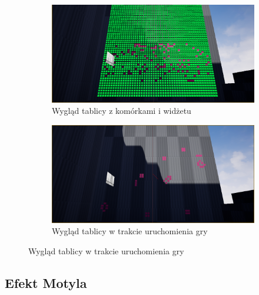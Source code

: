 \documentclass[a4paper,12pt,reqno]{article}
\begin{document}
\begin{figure}[!ht]%
	\centering
	\begin{subfigure}{.5\textwidth}
		\centering
		\includegraphics[width=0.9\linewidth]{graphics/gameoflife/GOLInUE_1.png}
		\caption{Wygląd tablicy z komórkami i widżetu}	
		\label{ref:subref_a}
	\end{subfigure}%
	\begin{subfigure}{.5\textwidth}
		\centering
		\includegraphics[width=0.9\linewidth]{graphics/gameoflife/GOLInUE_2.png}
		\caption{Wygląd tablicy w trakcie uruchomienia gry}
		\label{ref:subref_b}
	\end{subfigure}%
\label{ref:ref}
\end{figure}

\newpage
\subsection{Efekt Motyla}
\end{document}
